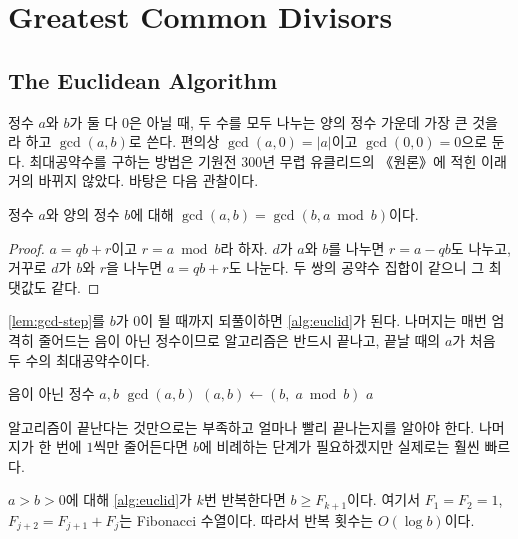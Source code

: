 \section{Greatest Common Divisors}
\label{sec:gcd}

\subsection{The Euclidean Algorithm}

정수 $a$와 $b$가 둘 다 $0$은 아닐 때, 두 수를 모두 나누는 양의 정수 가운데 가장 큰 것을 라 하고 $\gcd(a,b)$로 쓴다. 편의상 $\gcd(a,0)=|a|$이고 $\gcd(0,0)=0$으로 둔다. 최대공약수를 구하는 방법은 기원전 300년 무렵 유클리드의 《원론》에 적힌 이래 거의 바뀌지 않았다. 바탕은 다음 관찰이다.

\begin{lemma}
\label{lem:gcd-step}
정수 $a$와 양의 정수 $b$에 대해 $\gcd(a,b)=\gcd(b,a\bmod b)$이다.
\end{lemma}

\begin{proof}
$a=qb+r$이고 $r=a\bmod b$라 하자. $d$가 $a$와 $b$를 나누면 $r=a-qb$도 나누고, 거꾸로 $d$가 $b$와 $r$을 나누면 $a=qb+r$도 나눈다. 두 쌍의 공약수 집합이 같으니 그 최댓값도 같다.
\end{proof}

\cref{lem:gcd-step}를 $b$가 $0$이 될 때까지 되풀이하면 \cref{alg:euclid}가 된다. 나머지는 매번 엄격히 줄어드는 음이 아닌 정수이므로 알고리즘은 반드시 끝나고, 끝날 때의 $a$가 처음 두 수의 최대공약수이다.

\begin{algorithm}[htbp]
\begin{algorithmic}[1]
\Require 음이 아닌 정수 $a,b$
\Ensure $\gcd(a,b)$
  \State $(a,b)\gets(b,\;a\bmod b)$ 
\EndWhile
\State \Return $a$
\end{algorithmic}
\caption{유클리드 알고리즘}
\label{alg:euclid}
\end{algorithm}

알고리즘이 끝난다는 것만으로는 부족하고 얼마나 빨리 끝나는지를 알아야 한다. 나머지가 한 번에 $1$씩만 줄어든다면 $b$에 비례하는 단계가 필요하겠지만 실제로는 훨씬 빠르다.

\begin{theorem}[Lamé]
\label{thm:lame}
$a>b>0$에 대해 \cref{alg:euclid}가 $k$번 반복한다면 $b\ge F_{k+1}$이다. 여기서 $F_1=F_2=1$, $F_{j+2}=F_{j+1}+F_j$는 Fibonacci 수열이다. 따라서 반복 횟수는 $O(\log b)$이다.
\end{theorem}

